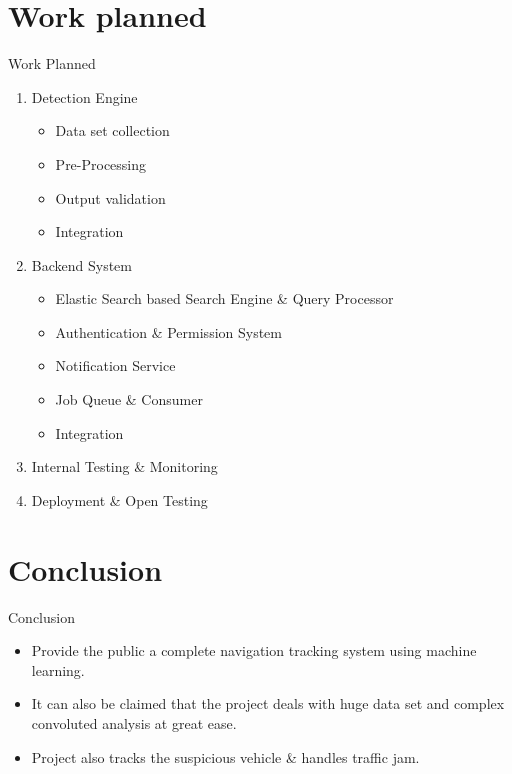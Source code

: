 \documentclass{beamer}
\begin{document}

\section{Work planned}
\begin{frame}{Work Planned}
\begin{enumerate}
	\item Detection Engine
		\begin{itemize}
			\item Data set collection
			\item Pre-Processing
			\item Output validation
			\item Integration
		\end{itemize}
	\item Backend System
		\begin{itemize}
			\item Elastic Search based Search Engine \& Query Processor 
			\item Authentication \& Permission System
			\item Notification Service
			\item Job Queue \& Consumer 
			\item Integration
		\end{itemize}
	\item Internal Testing \& Monitoring
    \item Deployment \& Open Testing
    

\end{enumerate}
\end{frame}


\section{Conclusion}
\begin{frame}{Conclusion}
\begin{itemize}
    \item Provide the public a complete navigation tracking system using machine learning.
    \item It can also be claimed that the project deals with huge data set and complex convoluted analysis at great ease.
    \item Project also tracks the suspicious vehicle \&
    handles traffic jam.
\end{itemize}
\end{frame}
\end{document}

